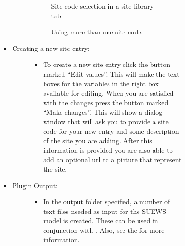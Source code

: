 \documentclass[letterpaper,10pt,english]{sphinxmanual}
\begin{document}
\begin{itemize}
\begin{description}
\begin{itemize}
\begin{description}
\begin{itemize}
\begin{description}
\begin{itemize}
\end{itemize}
\begin{wrapfigure}{r}{0pt}
\centering
\noindent{}
\caption{Site code selection in a site library tab}\label{\detokenize{pre-processor/SUEWS Prepare:id12}}\end{wrapfigure}
\begin{wrapfigure}{r}{0pt}
\centering
\noindent{}
\caption{Using more than one site code.}\label{\detokenize{pre-processor/SUEWS Prepare:id13}}\end{wrapfigure}

\end{description}

\item {} \begin{description}
\item[{Creating a new site entry:}] \leavevmode\begin{itemize}
\item {} 
To create a new site entry click the button marked “Edit values”. This will make the text boxes for the variables in the right box available for editing. When you are satisfied with the changes press the button marked “Make changes”. This will show a dialog window that will ask you to provide a site code for your new entry and some description of the site you are adding. After this information is provided you are also able to add an optional url to a picture that represent the site.

\end{itemize}

\end{description}

\item {} \begin{description}
\item[{Plugin Output:}] \leavevmode\begin{itemize}
\item {} 
In the output folder specified, a number of text files needed as input for the SUEWS model is created. These can be used in conjunction with {\hyperref[\detokenize{processor/Urban Energy Balance Urban Energy Balance (SUEWS.BLUEWS, advanced):suewsadvanced}]{}}. Also, see the  for more information.

\end{itemize}

\end{description}

\end{itemize}

\end{description}

\end{itemize}

\end{description}

\end{itemize}
\end{document}
